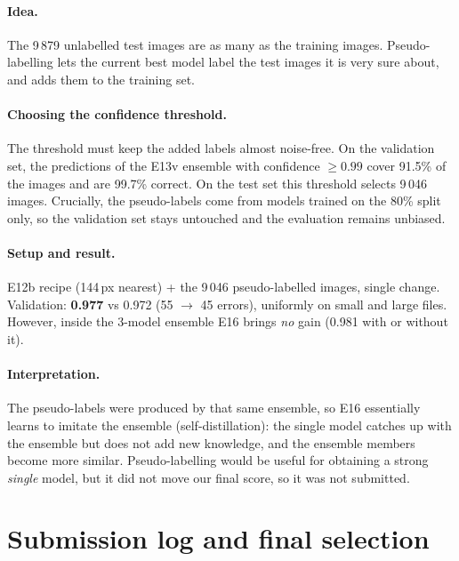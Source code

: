 \documentclass[11pt,a4paper]{article}
\begin{document}
\paragraph{Idea.} The 9\,879 unlabelled test images are as many as the training images. Pseudo-labelling
lets the current best model label the test images it is very sure about, and adds them to the training
set.

\paragraph{Choosing the confidence threshold.} The threshold must keep the added labels almost
noise-free. On the validation set, the predictions of the E13v ensemble with confidence $\ge0.99$
cover 91.5\% of the images and are 99.7\% correct. On the test set this threshold selects 9\,046
images. Crucially, the pseudo-labels come from models trained on the 80\% split only, so the
validation set stays untouched and the evaluation remains unbiased.

\paragraph{Setup and result.} E12b recipe (144\,px nearest) + the 9\,046 pseudo-labelled images, single
change. Validation: \textbf{0.977} vs 0.972 (55 $\to$ 45 errors), uniformly on small and large files.
However, inside the 3-model ensemble E16 brings \emph{no} gain (0.981 with or without it).

\paragraph{Interpretation.} The pseudo-labels were produced by that same ensemble, so E16 essentially
learns to imitate the ensemble (self-distillation): the single model catches up with the ensemble but
does not add new knowledge, and the ensemble members become more similar. Pseudo-labelling would be
useful for obtaining a strong \emph{single} model, but it did not move our final score, so it was not
submitted.

\section{Submission log and final selection}
\end{document}
